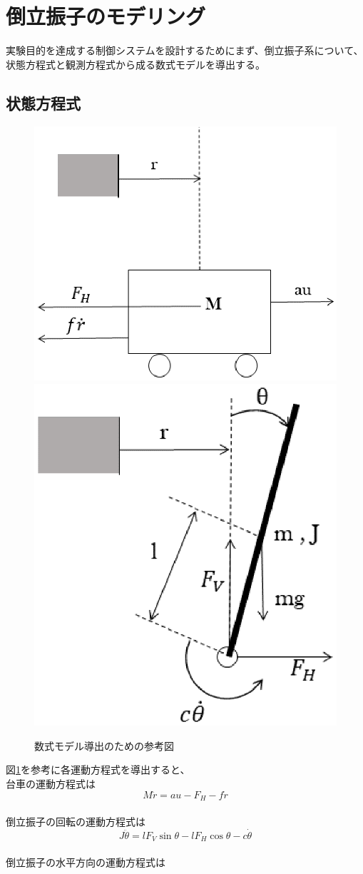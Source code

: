 \section{倒立振子のモデリング}
実験目的を達成する制御システムを設計するためにまず、倒立振子系について、状態方程式と観測方程式から成る数式モデルを導出する。
\subsection{状態方程式}
	\begin{figure}[H]
		\centering
		\includegraphics[width=0.4\linewidth]{gazo/cart.eps}
		\includegraphics[width=0.4\linewidth]{gazo/stick.eps}
		\caption{数式モデル導出のための参考図}
		\label{image:reference}
	\end{figure}	
	図\ref{image:reference}を参考に各運動方程式を導出すると、\\
	台車の運動方程式は\\
	
	\begin{equation}
		M\ddot{r}=au-F_{H}-f\dot{r}
		\label{eq:motion_eq_cart}
	\end{equation}
	\\
	倒立振子の回転の運動方程式は\\
	
	\begin{equation}
		J\ddot{\theta}=lF_{V}\sin \theta -lF_{H}\cos \theta -c\dot{\theta}
		\label{eq:rotemotion_eq_stick}
	\end{equation}
	\\
	倒立振子の水平方向の運動方程式は\\
	
